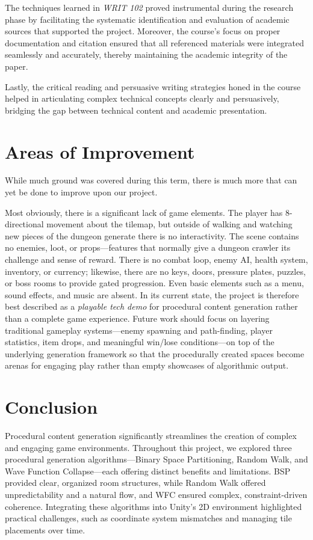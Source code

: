 \documentclass[a4paper, 12pt, one column, aas_macros]{article}
\begin{document}
The techniques learned in \textit{WRIT 102} proved instrumental during the research phase by facilitating the systematic identification and evaluation of academic sources that supported the project. Moreover, the course's focus on proper documentation and citation ensured that all referenced materials were integrated seamlessly and accurately, thereby maintaining the academic integrity of the paper.

Lastly, the critical reading and persuasive writing strategies honed in the course helped in articulating complex technical concepts clearly and persuasively, bridging the gap between technical content and academic presentation.

\section{Areas of Improvement}
While much ground was covered during this term, there is much more that can yet be done to improve upon our project.

Most obviously, there is a significant lack of game elements. The player has 8-directional movement about the tilemap, but outside of walking and watching new pieces of the dungeon generate there is no interactivity. The scene contains no enemies, loot, or props---features that normally give a dungeon crawler its challenge and sense of reward. There is no combat loop, enemy AI, health system, inventory, or currency; likewise, there are no keys, doors, pressure plates, puzzles, or boss rooms to provide gated progression. Even basic elements such as a menu, sound effects, and music are absent. In its current state, the project is therefore best described as a \emph{playable tech demo} for procedural content generation rather than a complete game experience. Future work should focus on layering traditional gameplay systems---enemy spawning and path-finding, player statistics, item drops, and meaningful win/lose conditions---on top of the underlying generation framework so that the procedurally created spaces become arenas for engaging play rather than empty showcases of algorithmic output.

\section{Conclusion}
Procedural content generation significantly streamlines the creation of complex and engaging game environments. Throughout this project, we explored three procedural generation algorithms---Binary Space Partitioning, Random Walk, and Wave Function Collapse---each offering distinct benefits and limitations. BSP provided clear, organized room structures, while Random Walk offered unpredictability and a natural flow, and WFC ensured complex, constraint-driven coherence. Integrating these algorithms into Unity's 2D environment highlighted practical challenges, such as coordinate system mismatches and managing tile placements over time.
\end{document}
